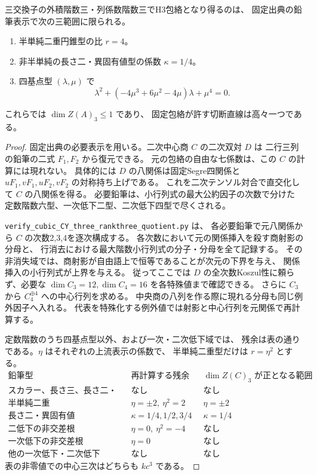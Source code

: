 \begin{theorem}\label{thm:cubic-CY-three-column-three-quotient-reduction}
三交換子の外積階数三・列係数階数三でH3包絡となり得るのは、
固定出典\cite{AS4CYpinned}の鉛筆表示で次の三範囲に限られる。
\begin{enumerate}
\item 半単純二重円錐型の比 $r=4$。
\item 非半単純の長さ二・異固有値型の係数 $\kappa=1/4$。
\item 四基点型 $(\lambda,\mu)$ で
\[
 \lambda^2+(-4\mu^3+6\mu^2-4\mu)\lambda+\mu^4=0 .
\]
\end{enumerate}
これらでは $\dim Z(A)_3\le1$ であり、
固定包絡が許す切断直線は高々一つである。
\end{theorem}
\begin{proof}
固定出典の必要表示を用いる。二次中心商 $C$ の二次双対 $D$ は
二行三列の鉛筆の二式 $F_1,F_2$ から復元できる。
元の包絡の自由な七係数は、この $C$ の計算には現れない。
具体的には $D$ の八関係は固定Segre四関係と
$uF_1,vF_1,uF_2,vF_2$ の対称持ち上げである。
これを二次テンソル対合で直交化して $C$ の八関係を得る。
必要鉛筆は、小行列式の最大公約因子の次数で分けた
定数階数六型、一次低下二型、二次低下四型で尽くされる。

\texttt{verify\_cubic\_CY\_three\_rankthree\_quotient.py} は、
各必要鉛筆で元八関係から $C$ の次数2,3,4を逐次構成する。
各次数において元の関係挿入を殺す商射影の分母と、
行消去における最大階数小行列式の分子・分母を全て記録する。
その非消失域では、商射影が自由語上で恒等であることが次元の下界を与え、
関係挿入の小行列式が上界を与える。
従ってここでは $D$ の全次数Koszul性に頼らず、必要な
$\dim C_3=12,\dim C_4=16$ を各特殊値まで確認できる。
さらに $C_3$ から $C_4^{\oplus4}$ への中心行列を求める。
中央商の八列を作る際に現れる分母も同じ例外因子へ入れる。
代表を特殊化する例外値では射影と中心行列を元関係で再計算する。

定数階数のうち四基点型以外、および一次・二次低下域では、
残余は表の通りである。$\eta$ はそれぞれの上流表示の係数で、
半単純二重型だけは $r=\eta^2$ とする。
\[
\begin{array}{c|l|l}
\text{鉛筆型}&\text{再計算する残余域}&\dim Z(C)_3\text{ が正となる範囲}\\ \hline
\text{スカラー、長さ三、長さ二・同固有値}&\text{なし}&\text{なし}\\
\text{半単純二重}&\eta=\pm2,\ \eta^2=2&\eta=\pm2\\
\text{長さ二・異固有値}&\kappa=1/4,1/2,3/4&\kappa=1/4\\
\text{二低下の非交差根}&\eta=0,\ \eta^2=-4&\text{なし}\\
\text{一次低下の非交差根}&\eta=0&\text{なし}\\
\text{他の一次低下・二次低下}&\text{なし}&\text{なし}
\end{array}
\]
表の非零値での中心三次はどちらも $kc^3$ である。


\end{proof}
